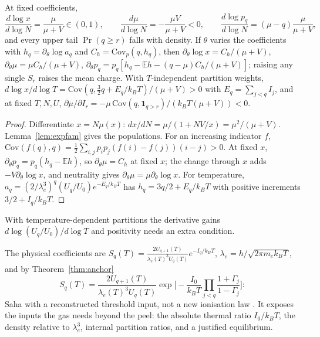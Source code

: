 \begin{theorem}\label{thm:response}
At fixed coefficients,
\[
\frac{d\log x}{d\log N}=\frac{\mu}{\mu+V}\in(0,1),\qquad\frac{d\mu}{d\log N}=-\frac{\mu V}{\mu+V}<0,\qquad\frac{d\log p_q}{d\log N}=(\mu-q)\frac{\mu}{\mu+V},
\]
and every upper tail $\Pr(q\ge r)$ falls with density. If $\theta$ varies the coefficients with $h_q=\partial_\theta\log a_q$ and $C_h=\mathrm{Cov}_p(q,h_q)$, then $\partial_\theta\log x=C_h/(\mu+V)$, $\partial_\theta\mu=\mu C_h/(\mu+V)$, $\partial_\theta p_q=p_q[h_q-\mathbb E h-(q-\mu)C_h/(\mu+V)]$; raising any single $S_r$ raises the mean charge. With $T$-independent partition weights, $d\log x/d\log T=\mathrm{Cov}(q,\tfrac32q+E_q/k_BT)/(\mu+V)>0$ with $E_q=\sum_{j<q}I_j$, and at fixed $T,N,U$, $\partial\mu/\partial I_r=-\mu\,\mathrm{Cov}(q,\mathbf 1_{q>r})/(k_BT(\mu+V))<0$. 
\end{theorem}
\begin{proof}
Differentiate $x=N\mu(x)$: $dx/dN=\mu/(1+NV/x)=\mu^2/(\mu+V)$. Lemma~\ref{lem:expfam} gives the populations. For an increasing indicator $f$, $\mathrm{Cov}(f(q),q)=\tfrac12\sum_{i,j}p_ip_j(f(i)-f(j))(i-j)>0$. At fixed $x$, $\partial_\theta p_q=p_q(h_q-\mathbb Eh)$, so $\partial_\theta\mu=C_h$ at fixed $x$; the change through $x$ adds $-V\partial_\theta\log x$, and neutrality gives $\partial_\theta\mu=\mu\partial_\theta\log x$. For temperature, $a_q=(2/\lambda_e^3)^q(U_q/U_0)e^{-E_q/k_BT}$ has $h_q=3q/2+E_q/k_BT$ with positive increments $3/2+I_q/k_BT$.
\end{proof}
With temperature-dependent partitions the derivative gains $d\log(U_q/U_0)/d\log T$ and positivity needs an extra condition.

The physical coefficients are $S_q(T)=\frac{2U_{q+1}(T)}{\lambda_e(T)^3U_q(T)}e^{-I_q/k_BT}$, $\lambda_e=h/\sqrt{2\pi m_ek_BT}$, and by Theorem~\ref{thm:anchor}
\[
S_q(T)=\frac{2U_{q+1}(T)}{\lambda_e(T)^3U_q(T)}\exp\Big[-\frac{I_0}{k_BT}\prod_{j<q}\frac{1+\Gamma_j}{1-\Gamma_j}\Big]:
\]
Saha with a reconstructed threshold input, not a new ionisation law . It exposes the inputs the gas needs beyond the peel: the absolute thermal ratio $I_0/k_BT$, the density relative to $\lambda_e^3$, internal partition ratios, and a justified equilibrium.

